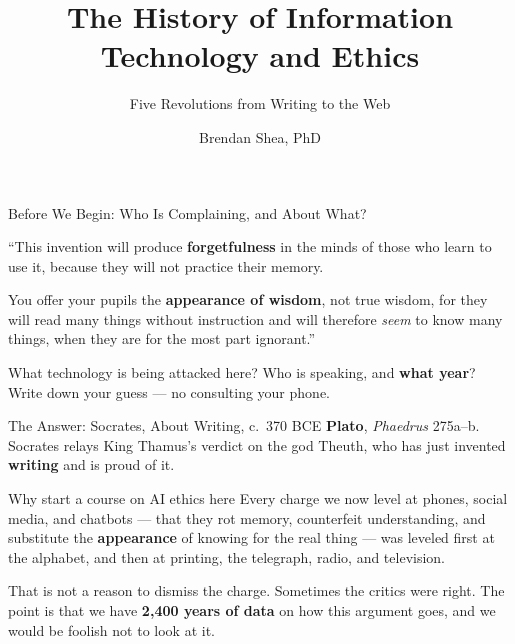 \documentclass[aspectratio=169,11pt]{beamer}
\title[History of Computing Ethics]{The History of Information Technology and Ethics}
\subtitle{Five Revolutions from Writing to the Web}
\author{Brendan Shea, PhD}
\institute{Rochester Community and Technical College\\PHIL 1150: Computing and AI Ethics}
\date{}
\begin{document}


\begin{frame}{Before We Begin: Who Is Complaining, and About What?}
\begin{quotebox}
\small
``This invention will produce \textbf{forgetfulness} in the minds of those who learn to use it, because they will not practice their memory.

You offer your pupils the \textbf{appearance of wisdom}, not true wisdom, for they will read many things without instruction and will therefore \emph{seem} to know many things, when they are for the most part ignorant.''
\end{quotebox}

\begin{discussionbox}
What technology is being attacked here? Who is speaking, and \textbf{what year}? Write down your guess --- no consulting your phone.
\end{discussionbox}
\end{frame}

\begin{frame}{The Answer: Socrates, About Writing, c.\ 370 BCE}
\textbf{Plato}, \textit{Phaedrus} 275a--b. Socrates relays King Thamus's verdict on the god Theuth, who has just invented \textbf{writing} and is proud of it.

\begin{alertblock}{Why start a course on AI ethics here}
Every charge we now level at phones, social media, and chatbots --- that they rot memory, counterfeit understanding, and substitute the \textbf{appearance} of knowing for the real thing --- was leveled first at the alphabet, and then at printing, the telegraph, radio, and television.
\end{alertblock}

That is not a reason to dismiss the charge. Sometimes the critics were right. The point is that we have \textbf{2{,}400 years of data} on how this argument goes, and we would be foolish not to look at it.
\end{frame}

\end{document}
